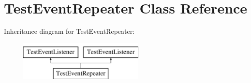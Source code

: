 \hypertarget{classtesting_1_1internal_1_1TestEventRepeater}{\section{\-Test\-Event\-Repeater \-Class \-Reference}
\label{d9/df1/classtesting_1_1internal_1_1TestEventRepeater}
}
\-Inheritance diagram for \-Test\-Event\-Repeater\-:\begin{figure}[H]
\begin{center}
\leavevmode
\includegraphics[height=2.000000cm]{d9/df1/classtesting_1_1internal_1_1TestEventRepeater}
\end{center}
\end{figure}
